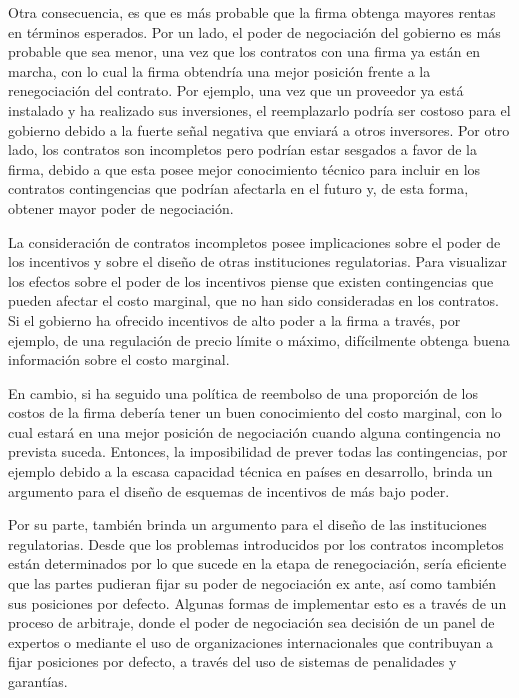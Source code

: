 \documentclass[
  12pt,
  spanish,
]{book}
\begin{document}
Otra consecuencia, es que es más probable que la firma obtenga mayores
rentas en términos esperados. Por un lado, el poder de negociación del
gobierno es más probable que sea menor, una vez que los contratos con
una firma ya están en marcha, con lo cual la firma obtendría una mejor
posición frente a la renegociación del contrato. Por ejemplo, una vez
que un proveedor ya está instalado y ha realizado sus inversiones, el
reemplazarlo podría ser costoso para el gobierno debido a la fuerte
señal negativa que enviará a otros inversores. Por otro lado, los
contratos son incompletos pero podrían estar sesgados a favor de la
firma, debido a que esta posee mejor conocimiento técnico para incluir
en los contratos contingencias que podrían afectarla en el futuro y, de
esta forma, obtener mayor poder de negociación.

La consideración de contratos incompletos posee implicaciones sobre el
poder de los incentivos y sobre el diseño de otras instituciones
regulatorias. Para visualizar los efectos sobre el poder de los
incentivos piense que existen contingencias que pueden afectar el costo
marginal, que no han sido consideradas en los contratos. Si el gobierno
ha ofrecido incentivos de alto poder a la firma a través, por ejemplo,
de una regulación de precio límite o máximo, difícilmente obtenga buena
información sobre el costo marginal.

En cambio, si ha seguido una política de reembolso de una proporción de
los costos de la firma debería tener un buen conocimiento del costo
marginal, con lo cual estará en una mejor posición de negociación cuando
alguna contingencia no prevista suceda. Entonces, la imposibilidad de
prever todas las contingencias, por ejemplo debido a la escasa capacidad
técnica en países en desarrollo, brinda un argumento para el diseño de
esquemas de incentivos de más bajo poder.

Por su parte, también brinda un argumento para el diseño de las
instituciones regulatorias. Desde que los problemas introducidos por los
contratos incompletos están determinados por lo que sucede en la etapa
de renegociación, sería eficiente que las partes pudieran fijar su poder
de negociación ex ante, así como también sus posiciones por defecto.
Algunas formas de implementar esto es a través de un proceso de
arbitraje, donde el poder de negociación sea decisión de un panel de
expertos o mediante el uso de organizaciones internacionales que
contribuyan a fijar posiciones por defecto, a través del uso de sistemas
de penalidades y garantías.
\end{document}
